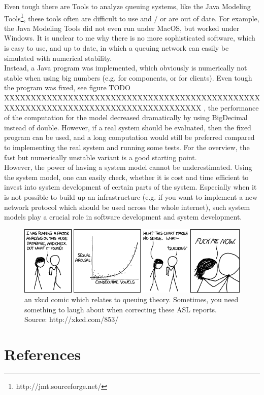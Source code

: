 \documentclass[a4paper]{article}
\begin{document}
Even tough there are Tools to analyze queuing systems, like the Java Modeling Tools\footnote{http://jmt.sourceforge.net/}, these tools often are difficult to use and / or are out of date. For example, the Java Modeling Tools did not even run under MacOS, but worked under Windows. It is unclear to me why there is no more sophisticated software, which is easy to use, and up to date, in which a queuing network can easily be simulated with numerical stability.\\

Instead, a Java program was implemented, which obviously is numerically not stable when using big numbers (e.g. for components, or for clients). Even tough the program was fixed, see figure  TODO XXXXXXXXXXXXXXXXXXXXXXXXXXXXXXXXXXXXXXXXXXXXXXXXXXXXXXXXXXXXXXXXXXXXXXXXXXXXXXXXXXXXX
, the performance of the computation for the model decreased dramatically by using BigDecimal instead of double. However, if a real system should be evaluated, then the fixed program can be used, and a long computation would still be preferred compared to implementing the real system and running some tests. For the overview, the fast but numerically unstable variant is a good starting point.\\

However, the power of having a system model cannot be underestimated. Using the system model, one can easily check, whether it is cost and time efficient to invest into system development of certain parts of the system. Especially when it is not possible to build up an infrastructure (e.g. if you want to implement a new network protocol which should be used across the whole internet), such system models play a crucial role in software development and system development.\\

\begin{figure}[H]
	\begin{center}
    \includegraphics[scale=0.52]{consecutive_vowels.png}
  \end{center}
  \caption{an xkcd comic which relates to queuing theory. Sometimes, you need something to laugh about when correcting these ASL reports. Source: http://xkcd.com/853/}
\end{figure}

\pagebreak

\section{References}





\end{document}
